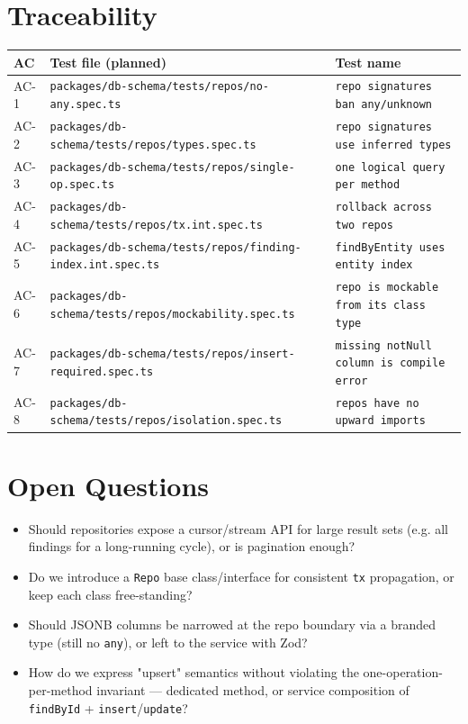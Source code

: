 \section{Traceability}

\begin{center}
\small
\begin{tabular}{@{}lll@{}}
\toprule
AC & Test file (planned) & Test name \\
\midrule
AC-1 & \texttt{packages/db-schema/tests/repos/no-any.spec.ts}         & \texttt{repo signatures ban any/unknown} \\
AC-2 & \texttt{packages/db-schema/tests/repos/types.spec.ts}          & \texttt{repo signatures use inferred types} \\
AC-3 & \texttt{packages/db-schema/tests/repos/single-op.spec.ts}      & \texttt{one logical query per method} \\
AC-4 & \texttt{packages/db-schema/tests/repos/tx.int.spec.ts}         & \texttt{rollback across two repos} \\
AC-5 & \texttt{packages/db-schema/tests/repos/finding-index.int.spec.ts} & \texttt{findByEntity uses entity index} \\
AC-6 & \texttt{packages/db-schema/tests/repos/mockability.spec.ts}    & \texttt{repo is mockable from its class type} \\
AC-7 & \texttt{packages/db-schema/tests/repos/insert-required.spec.ts}& \texttt{missing notNull column is compile error} \\
AC-8 & \texttt{packages/db-schema/tests/repos/isolation.spec.ts}      & \texttt{repos have no upward imports} \\
\bottomrule
\end{tabular}
\end{center}

\section{Open Questions}
\begin{itemize}[leftmargin=1.2em]
  \item Should repositories expose a cursor/stream API for large result sets
        (e.g. all findings for a long-running cycle), or is pagination enough?
  \item Do we introduce a \texttt{Repo} base class/interface for consistent
        \texttt{tx} propagation, or keep each class free-standing?
  \item Should JSONB columns be narrowed at the repo boundary via a branded
        type (still no \texttt{any}), or left to the service with Zod?
  \item How do we express "upsert" semantics without violating the
        one-operation-per-method invariant --- dedicated method, or service
        composition of \texttt{findById} + \texttt{insert}/\texttt{update}?
\end{itemize}


